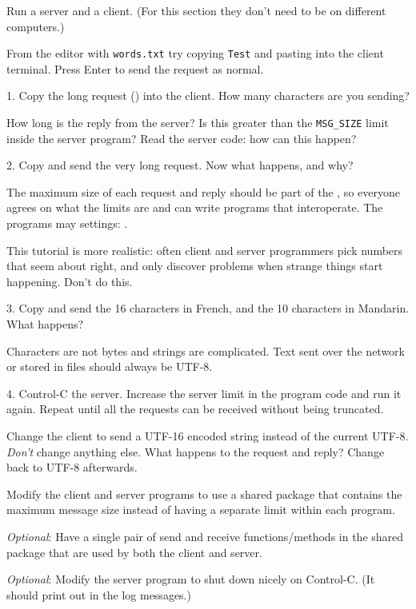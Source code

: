 Run a server and a client. (For this section they don't need to be on different
computers.)

From the editor with \texttt{words.txt} try copying \texttt{Test} and pasting into
the client terminal. Press Enter to send the request as normal.

1. Copy the long request () into the client. How many characters
are you sending?

How long is the reply from the server? Is this greater than the \texttt{MSG\_SIZE}
limit inside the server program? Read the server code: how can this happen?

2. Copy and send the very long request. Now what happens, and why?

\begin{IMPORTANT}
The maximum size of each request and reply should be part of the , so everyone agrees on what the limits are and can write programs that
interoperate. The programs may  settings:  .

This tutorial is more realistic: often client and server programmers pick
numbers that seem about right, and only discover problems when strange things start
happening. Don't do this.
\end{IMPORTANT}

3. Copy and send the 16 characters in French, and the 10 characters in Mandarin.
What happens?

\begin{IMPORTANT}
Characters are not bytes and strings are complicated. Text sent over the network
or stored in files should always be UTF-8.
\end{IMPORTANT}

4. Control-C the server. Increase the server limit in the program code and run it
again. Repeat until all the requests can be received without being truncated.



Change the client  to send a UTF-16 encoded string instead of the
current UTF-8. \emph{Don't} change anything else. What happens to the request and
reply? Change back to UTF-8 afterwards.

Modify the client and server programs to use a shared package that contains the
maximum message size instead of having a separate limit within each program.

\emph{Optional}: Have a single pair of send and receive functions/methods
in the shared package that are used by both the client and server.

\emph{Optional}: Modify the server program to shut down nicely on Control-C.
(It should print out  in the log messages.)


\COPYRIGHT


